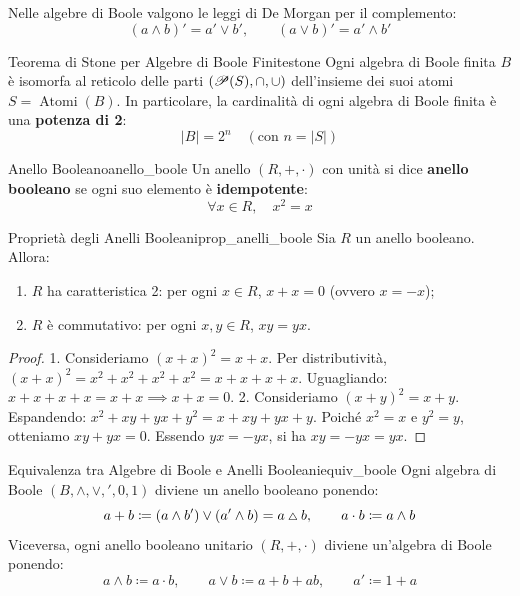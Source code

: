 Nelle algebre di Boole valgono le leggi di De Morgan per il complemento:
\[
    (a \wedge b)' = a' \vee b', \qquad (a \vee b)' = a' \wedge b'
\]

\begin{teorema}{Teorema di Stone per Algebre di Boole Finite}{stone}
Ogni algebra di Boole finita $B$ è isomorfa al reticolo delle parti $(\P(S), \cap, \cup)$ dell'insieme dei suoi atomi $S = \operatorname{Atomi}(B)$.
In particolare, la cardinalità di ogni algebra di Boole finita è una \textbf{potenza di 2}:
\[
    |B| = 2^n \quad (\text{con } n = |S|)
\]
\end{teorema}

\begin{definizione}{Anello Booleano}{anello_boole}
Un anello $(R, +, \cdot)$ con unità si dice \textbf{anello booleano} se ogni suo elemento è \textbf{idempotente}:
\[
    \forall x \in R, \quad x^2 = x
\]
\end{definizione}

\begin{teorema}{Proprietà degli Anelli Booleani}{prop_anelli_boole}
Sia $R$ un anello booleano. Allora:
\begin{enumerate}
    \item $R$ ha caratteristica 2: per ogni $x \in R$, $x + x = 0$ (ovvero $x = -x$);
    \item $R$ è commutativo: per ogni $x, y \in R$, $xy = yx$.
\end{enumerate}
\end{teorema}
\begin{proof}
1. Consideriamo $(x + x)^2 = x + x$. Per distributività, $(x+x)^2 = x^2 + x^2 + x^2 + x^2 = x + x + x + x$. Uguagliando: $x + x + x + x = x + x \implies x + x = 0$.
2. Consideriamo $(x + y)^2 = x + y$. Espandendo: $x^2 + xy + yx + y^2 = x + xy + yx + y$. Poiché $x^2 = x$ e $y^2 = y$, otteniamo $xy + yx = 0$. Essendo $yx = -yx$, si ha $xy = -yx = yx$.
\end{proof}

\begin{teorema}{Equivalenza tra Algebre di Boole e Anelli Booleani}{equiv_boole}
Ogni algebra di Boole $(B, \wedge, \vee, ', 0, 1)$ diviene un anello booleano ponendo:
\[
    a + b \coloneqq (a \wedge b') \vee (a' \wedge b) = a \ds b, \qquad a \cdot b \coloneqq a \wedge b
\]
Viceversa, ogni anello booleano unitario $(R, +, \cdot)$ diviene un'algebra di Boole ponendo:
\[
    a \wedge b \coloneqq a \cdot b, \qquad a \vee b \coloneqq a + b + ab, \qquad a' \coloneqq 1 + a
\]
\end{teorema}
